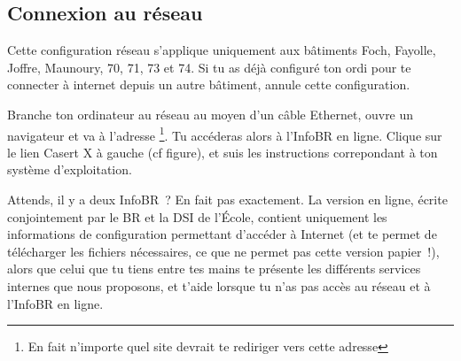 
\subsection{Connexion au réseau}

Cette configuration réseau s'applique uniquement aux bâtiments Foch, Fayolle, Joffre, Maunoury, 70, 71, 73 et 74. Si tu as déjà configuré ton ordi pour te connecter à internet depuis un autre bâtiment, annule cette configuration.

Branche ton ordinateur au réseau au moyen d'un câble Ethernet, ouvre un navigateur et va à l'adresse \footnote{En fait n'importe quel site devrait te rediriger vers cette adresse}. Tu accéderas alors à l'InfoBR en ligne. Clique sur le lien Casert X à gauche (cf figure), et suis les instructions correpondant à ton système d'exploitation.

Attends, il y a deux InfoBR~? En fait pas exactement. La version en ligne, écrite conjointement par le BR et la DSI de l'École,  contient uniquement les informations de configuration permettant d'accéder à Internet (et te permet de télécharger les fichiers nécessaires, ce que ne permet pas cette version papier~!), alors que celui que tu tiens entre tes mains te présente les différents services internes que nous proposons, et t'aide lorsque tu n'as pas accès au réseau et à l'InfoBR en ligne.

